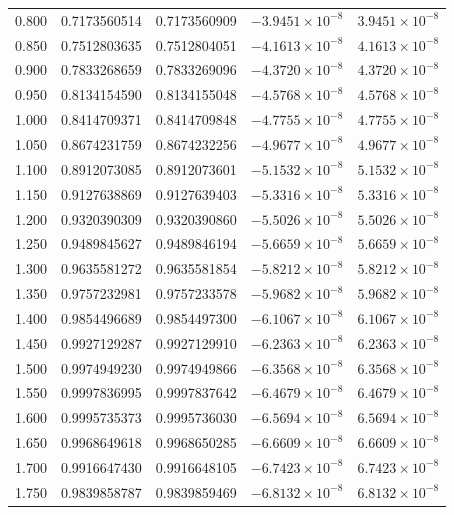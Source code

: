 \documentclass[11pt,a4paper]{article}
\begin{document}
\begin{longtable}{rrrrr}
0.800 & 0.7173560514 & 0.7173560909 & $-3.9451\times 10^{-8}$ & $3.9451\times 10^{-8}$ \\
0.850 & 0.7512803635 & 0.7512804051 & $-4.1613\times 10^{-8}$ & $4.1613\times 10^{-8}$ \\
0.900 & 0.7833268659 & 0.7833269096 & $-4.3720\times 10^{-8}$ & $4.3720\times 10^{-8}$ \\
0.950 & 0.8134154590 & 0.8134155048 & $-4.5768\times 10^{-8}$ & $4.5768\times 10^{-8}$ \\
1.000 & 0.8414709371 & 0.8414709848 & $-4.7755\times 10^{-8}$ & $4.7755\times 10^{-8}$ \\
1.050 & 0.8674231759 & 0.8674232256 & $-4.9677\times 10^{-8}$ & $4.9677\times 10^{-8}$ \\
1.100 & 0.8912073085 & 0.8912073601 & $-5.1532\times 10^{-8}$ & $5.1532\times 10^{-8}$ \\
1.150 & 0.9127638869 & 0.9127639403 & $-5.3316\times 10^{-8}$ & $5.3316\times 10^{-8}$ \\
1.200 & 0.9320390309 & 0.9320390860 & $-5.5026\times 10^{-8}$ & $5.5026\times 10^{-8}$ \\
1.250 & 0.9489845627 & 0.9489846194 & $-5.6659\times 10^{-8}$ & $5.6659\times 10^{-8}$ \\
1.300 & 0.9635581272 & 0.9635581854 & $-5.8212\times 10^{-8}$ & $5.8212\times 10^{-8}$ \\
1.350 & 0.9757232981 & 0.9757233578 & $-5.9682\times 10^{-8}$ & $5.9682\times 10^{-8}$ \\
1.400 & 0.9854496689 & 0.9854497300 & $-6.1067\times 10^{-8}$ & $6.1067\times 10^{-8}$ \\
1.450 & 0.9927129287 & 0.9927129910 & $-6.2363\times 10^{-8}$ & $6.2363\times 10^{-8}$ \\
1.500 & 0.9974949230 & 0.9974949866 & $-6.3568\times 10^{-8}$ & $6.3568\times 10^{-8}$ \\
1.550 & 0.9997836995 & 0.9997837642 & $-6.4679\times 10^{-8}$ & $6.4679\times 10^{-8}$ \\
1.600 & 0.9995735373 & 0.9995736030 & $-6.5694\times 10^{-8}$ & $6.5694\times 10^{-8}$ \\
1.650 & 0.9968649618 & 0.9968650285 & $-6.6609\times 10^{-8}$ & $6.6609\times 10^{-8}$ \\
1.700 & 0.9916647430 & 0.9916648105 & $-6.7423\times 10^{-8}$ & $6.7423\times 10^{-8}$ \\
1.750 & 0.9839858787 & 0.9839859469 & $-6.8132\times 10^{-8}$ & $6.8132\times 10^{-8}$ \\

\end{longtable}
\end{document}

